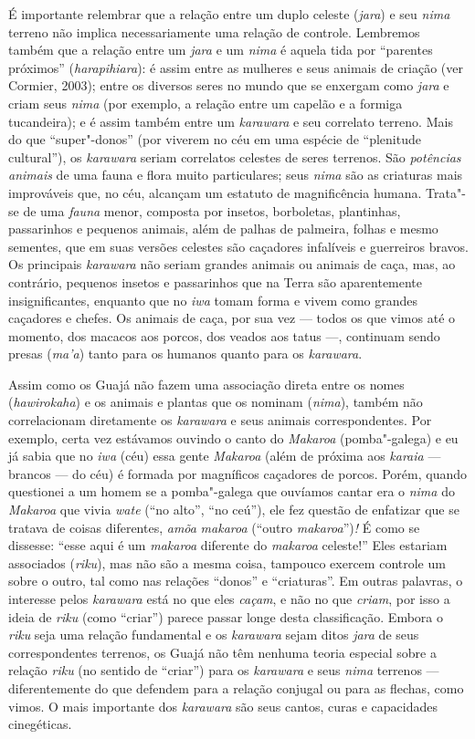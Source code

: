 É importante relembrar que a relação entre um duplo celeste
(\emph{jara}) e seu \emph{nima} terreno não implica necessariamente uma
relação de controle. Lembremos também que a relação entre um \emph{jara}
e um \emph{nima} é aquela tida por ``parentes próximos''
(\emph{harapihiara}): é assim entre as mulheres e seus animais de
criação (ver Cormier, 2003); entre os diversos seres no mundo que se
enxergam como \emph{jara} e criam seus \emph{nima} (por exemplo, a
relação entre um capelão e a formiga tucandeira); e é assim também entre
um \emph{karawara} e seu correlato terreno. Mais do que ``super"-donos''
(por viverem no céu em uma espécie de ``plenitude cultural''), os
\emph{karawara} seriam correlatos celestes de seres terrenos. São
\emph{potências animais} de uma fauna e flora muito particulares; seus
\emph{nima} são as criaturas mais improváveis que, no céu, alcançam um
estatuto de magnificência humana. Trata"-se de uma \emph{fauna} menor,
composta por insetos, borboletas, plantinhas, passarinhos e pequenos
animais, além de palhas de palmeira, folhas e mesmo sementes, que em
suas versões celestes são caçadores infalíveis e guerreiros bravos. Os
principais \emph{karawara} não seriam grandes animais ou animais de
caça, mas, ao contrário, pequenos insetos e passarinhos que na Terra são
aparentemente insignificantes, enquanto que no \emph{iwa} tomam forma e
vivem como grandes caçadores e chefes. Os animais de caça, por sua vez ---
todos os que vimos até o momento, dos macacos aos porcos, dos veados aos
tatus ---, continuam sendo presas (\emph{ma'a}) tanto para os humanos
quanto para os \emph{karawara}.

Assim como os Guajá não fazem uma associação direta entre os nomes
(\emph{hawirokaha}) e os animais e plantas que os nominam (\emph{nima}),
também não correlacionam diretamente os \emph{karawara} e seus animais
correspondentes. Por exemplo, certa vez estávamos ouvindo o canto do
\emph{Makaroa} (pomba"-galega) e eu já sabia que no \emph{iwa} (céu) essa
gente \emph{Makaroa} (além de próxima aos \emph{karaia} --- brancos --- do
céu) é formada por magníficos caçadores de porcos. Porém, quando
questionei a um homem se a pomba"-galega que ouvíamos cantar era o
\emph{nima} do \emph{Makaroa} que vivia \emph{wate} (``no alto'', ``no
ceú''), ele fez questão de enfatizar que se tratava de coisas diferentes,
\emph{amõa} \emph{makaroa} (``outro \emph{makaroa}'')\emph{!} É como se
dissesse: ``esse aqui é um \emph{makaroa} diferente do \emph{makaroa}
celeste!'' Eles estariam associados (\emph{riku}), mas não são a mesma
coisa, tampouco exercem controle um sobre o outro, tal como nas relações
``donos'' e ``criaturas''. Em outras palavras, o interesse pelos
\emph{karawara} está no que eles \emph{caçam}, e não no que
\emph{criam}, por isso a ideia de \emph{riku} (como ``criar'') parece
passar longe desta classificação. Embora o \emph{riku} seja uma relação
fundamental e os \emph{karawara} sejam ditos \emph{jara} de seus
correspondentes terrenos, os Guajá não têm nenhuma teoria especial sobre
a relação \emph{riku} (no sentido de ``criar'') para os \emph{karawara} e
seus \emph{nima} terrenos --- diferentemente do que defendem para a
relação conjugal ou para as flechas, como vimos. O mais importante dos
\emph{karawara} são seus cantos, curas e capacidades cinegéticas.

